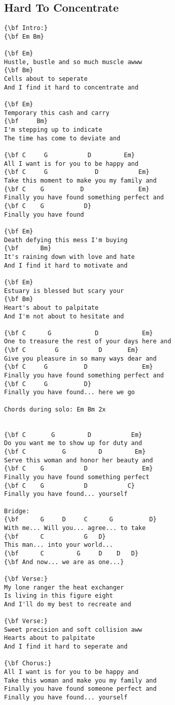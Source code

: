 \documentclass[a4paper]{article}
\begin{document}
\subsection{Hard To Concentrate} %
\label{sub:Hard To Concentr}
\begin{Verbatim}[commandchars=\\\{\}]
{\bf Intro:}
{\bf Em Bm}

{\bf Em}
Hustle, bustle and so much muscle awww
{\bf Bm}
Cells about to seperate
And I find it hard to concentrate and

{\bf Em}
Temporary this cash and carry
{\bf     Bm}
I'm stepping up to indicate
The time has come to deviate and

{\bf C     G           D         Em}
All I want is for you to be happy and
{\bf C     G             D           Em}
Take this moment to make you my family and
{\bf C    G 		 D               Em}
Finally you have found something perfect and
{\bf C    G           D}
Finally you have found

{\bf Em}
Death defying this mess I'm buying
{\bf      Bm}
It's raining down with love and hate
And I find it hard to motivate and

{\bf Em}
Estuary is blessed but scary your
{\bf Bm}
Heart's about to palpitate
And I'm not about to hesitate and

{\bf C      G            D            Em}
One to treasure the rest of your days here and
{\bf C        G           D       Em}
Give you pleasure in so many ways dear and
{\bf C     G          D               Em}
Finally you have found something perfect and
{\bf C     G          D}
Finally you have found... here we go

Chords during solo: Em Bm 2x


{\bf C       G         D           Em}
Do you want me to show up for duty and
{\bf C          G         D         Em}
Serve this woman and honor her beauty and
{\bf C    G           D               Em}
Finally you have found something perfect
{\bf C    G           D           C}
Finally you have found... yourself

Bridge:
{\bf      G     D     C      G          D}
With me... Will you... agree... to take
{\bf      C		      G   D}
This man... into your world...
{\bf      C         G     D    D   D}
{\bf And now... we are as one...}

{\bf Verse:}
My lone ranger the heat exchanger
Is living in this figure eight
And I'll do my best to recreate and

{\bf Verse:}
Sweet precision and soft collision aww
Hearts about to palpitate
And I find it hard to seperate and

{\bf Chorus:}
All I want is for you to be happy and
Take this woman and make you my family and
Finally you have found someone perfect and
Finally you have found... yourself
\end{Verbatim}
\newpage
\end{document}
